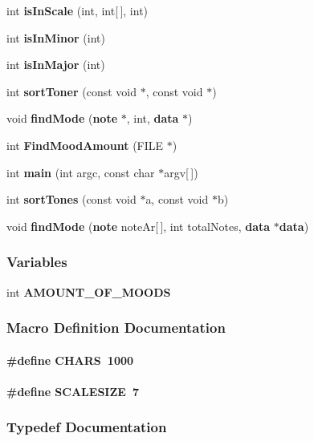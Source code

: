\begin{DoxyCompactItemize}
int {\bf is\+In\+Scale} (int, int[$\,$], int)
\item 
int {\bf is\+In\+Minor} (int)
\item 
int {\bf is\+In\+Major} (int)
\item 
int {\bf sort\+Toner} (const void $\ast$, const void $\ast$)
\item 
void {\bf find\+Mode} ({\bf note} $\ast$, int, {\bf data} $\ast$)
\item 
int {\bf Find\+Mood\+Amount} (F\+I\+L\+E $\ast$)
\item 
int {\bf main} (int argc, const char $\ast$argv[$\,$])
\item 
int {\bf sort\+Tones} (const void $\ast$a, const void $\ast$b)
\item 
void {\bf find\+Mode} ({\bf note} note\+Ar[$\,$], int total\+Notes, {\bf data} $\ast${\bf data})
\end{DoxyCompactItemize}
\subsubsection*{Variables}
\begin{DoxyCompactItemize}
\item 
int {\bf A\+M\+O\+U\+N\+T\+\_\+\+O\+F\+\_\+\+M\+O\+O\+D\+S}
\end{DoxyCompactItemize}


\subsubsection{Macro Definition Documentation}
\paragraph[{C\+H\+A\+R\+S}]{\setlength{\rightskip}{0pt plus 5cm}\#define C\+H\+A\+R\+S~1000}\label{main_8c_a5d7cfaaf3d71eb89b31364adb9fda6a6}
\paragraph[{S\+C\+A\+L\+E\+S\+I\+Z\+E}]{\setlength{\rightskip}{0pt plus 5cm}\#define S\+C\+A\+L\+E\+S\+I\+Z\+E~7}\label{main_8c_a3c7b5c7d1b09d118aa63ec87e3c73a8b}


\subsubsection{Typedef Documentation}
